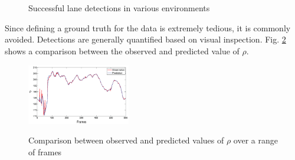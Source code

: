 \documentclass{article}
\begin{document}
\begin{figure}[htb!]
  \centering
  \hspace{0.00001in}
  \\
  \hspace{0.00001in}
  \\
  \caption{Successful lane detections in various environments}
  \label{fig:lane_detection}
\end{figure}
Since defining a ground truth for the data is extremely tedious, it is commonly avoided. 
Detections are generally quantified based on visual inspection. Fig. \ref{fig:obs_pred_kalman} shows a comparison between the observed and predicted value of $\rho$.
\begin{figure}[htb!]
  \centering
  \includegraphics[width=0.4\textwidth]{IMG/obs_pred_rho_crop.png}\\
  \caption{Comparison between observed and predicted values of $\rho$ over a range of frames}
  \label{fig:obs_pred_kalman}
\end{figure}
\end{document}
